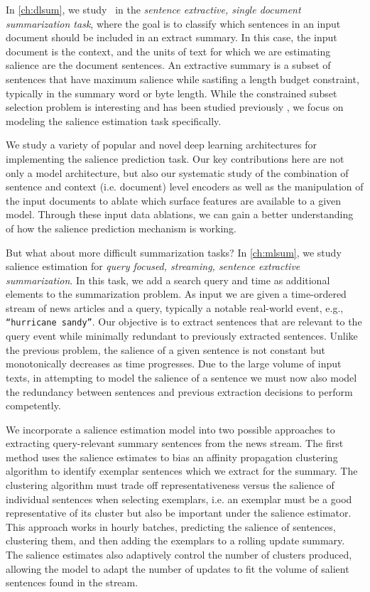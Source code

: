 In \autoref{ch:dlsum}, we study \salienceestimation~in
the \emph{sentence extractive, single document summarization task}, where the
goal is to classify which sentences in an input document should be included in
an extract summary.  In this case, the input document is the context, and the
units of text for which we are estimating salience are the document sentences.
An extractive summary is a subset of sentences that have maximum salience
while sastifing a length budget constraint, typically in the summary word or
byte length. While the constrained subset selection problem is interesting and
has been studied previously \citep{goldstein1998,mcdonald2007,lin2010}, we
focus on modeling the salience estimation task specifically. 
 
We study a variety of popular and novel deep learning architectures for
implementing the salience prediction task. Our key contributions here are not only a 
model architecture, but also our systematic study of the combination of sentence
and context (i.e. document) level encoders as well as the manipulation of the
input documents to ablate which surface features are available to a given
model. Through these input data ablations, we can gain a better understanding
of how the salience prediction mechanism is working.
 
But what about more difficult summarization tasks? In \autoref{ch:mlsum}, we
study salience estimation for \emph{query focused, streaming, sentence
extractive summarization}. In this task, we add a search query and time as
additional elements to the summarization problem. As input we are given a
time-ordered stream of news articles and a query, typically a notable
real-world event, e.g., \texttt{``hurricane sandy''}. Our objective is to
extract sentences that are relevant to the query event while minimally
redundant to previously extracted sentences. Unlike the previous problem, the
salience of a given sentence is not constant but monotonically decreases as time
progresses. Due to the large volume of input texts, in attempting to 
model the salience of a sentence we must now also model the 
redundancy between sentences and previous extraction decisions to perform
competently.
      
We incorporate a salience estimation model into two possible approaches to
extracting query-relevant summary sentences from the news stream.  The first
method uses the salience estimates to bias an affinity propagation clustering
algorithm \citep{dueck2009} to identify exemplar sentences which we extract for the
summary.  The clustering algorithm must trade off representativeness versus
the salience of individual sentences when selecting exemplars, i.e. an
exemplar must be a good representative of its cluster but also be important
under the salience estimator.  This approach works in hourly batches,
predicting the salience of sentences, clustering them, and then adding the
exemplars to a rolling update summary. The salience estimates also adaptively
control the number of clusters produced, allowing the model to adapt the
number of updates to fit the volume of salient sentences found in the stream. 


